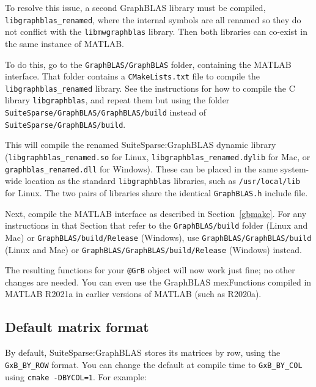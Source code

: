 \documentclass[12pt]{article}
\begin{document}
To resolve this issue, a second GraphBLAS library must be compiled,
\verb'libgraphblas_renamed', where the internal symbols are all renamed so they
do not conflict with the \verb'libmwgraphblas' library.  Then both libraries
can co-exist in the same instance of MATLAB.

To do this, go to the \verb'GraphBLAS/GraphBLAS' folder, containing the
MATLAB interface.  That folder contains a \verb'CMakeLists.txt' file to
compile the \verb'libgraphblas_renamed' library.  See the instructions
for how to compile the C library \verb'libgraphblas', and repeat them but
using the folder \newline
\verb'SuiteSparse/GraphBLAS/GraphBLAS/build' instead of \newline
\verb'SuiteSparse/GraphBLAS/build'.

This will compile the renamed SuiteSparse:GraphBLAS dynamic library
(\verb'libgraphblas_renamed.so' for Linux, \verb'libgraphblas_renamed.dylib'
for Mac, or \verb'graphblas_renamed.dll' for Windows).  These can be
placed in the same system-wide location as the standard \verb'libgraphblas'
libraries, such as \verb'/usr/local/lib' for Linux.  The two pairs of
libraries share the identical \verb'GraphBLAS.h' include file.

Next, compile the MATLAB interface as described in Section~\ref{gbmake}.  For
any instructions in that Section that refer to the \verb'GraphBLAS/build'
folder (Linux and Mac) or \verb'GraphBLAS/build/Release' (Windows), use \newline
\verb'GraphBLAS/GraphBLAS/build' (Linux and Mac) or \newline
\verb'GraphBLAS/GraphBLAS/build/Release' (Windows) instead.

The resulting functions for your \verb'@GrB' object will now work just fine;
no other changes are needed.  You can even use the GraphBLAS mexFunctions
compiled in MATLAB R2021a in earlier versions of MATLAB (such as R2020a).

\subsection{Default matrix format}

By default, SuiteSparse:GraphBLAS stores its matrices by row, using the
\verb'GxB_BY_ROW' format.  You can change the default at compile time to
\verb'GxB_BY_COL' using \verb'cmake -DBYCOL=1'.  For example:
\end{document}
